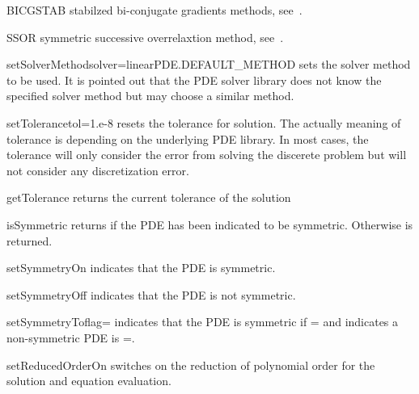 \begin{memberdesc}[LinearPDE]{BICGSTAB}
stabilzed bi-conjugate gradients methods, see~. 
\end{memberdesc}

\begin{memberdesc}[LinearPDE]{SSOR}
symmetric successive overrelaxtion method, see~.
\end{memberdesc}

\begin{methoddesc}[LinearPDE]{setSolverMethod}{solver=linearPDE.DEFAULT_METHOD}
sets the solver method to be used. It is pointed out that the PDE solver library
does not know the specified solver method but may choose a similar method. 
\end{methoddesc}

\begin{methoddesc}[LinearPDE]{setTolerance}{tol=1.e-8}
resets the tolerance for solution. The actually meaning of tolerance is
depending on the underlying PDE library. In most cases, the tolerance 
will only consider the error from solving the discerete problem but will
not consider any discretization error.
\end{methoddesc}

\begin{methoddesc}[LinearPDE]{getTolerance}{}
returns the current tolerance of the solution
\end{methoddesc}

\begin{methoddesc}[LinearPDE]{isSymmetric}{}
returns \True if the PDE has been indicated to be symmetric.
Otherwise \False is returned.
\end{methoddesc}

\begin{methoddesc}[LinearPDE]{setSymmetryOn}{}
indicates that the PDE is symmetric.
\end{methoddesc}

\begin{methoddesc}[LinearPDE]{setSymmetryOff}{}
indicates that the PDE is not symmetric.
\end{methoddesc}

\begin{methoddesc}[LinearPDE]{setSymmetryTo}{flag=\False}
indicates that the PDE is symmetric if =\True
and indicates a non-symmetric PDE is =\False. 
\end{methoddesc}

\begin{methoddesc}[LinearPDE]{setReducedOrderOn}{}
switches on the reduction of polynomial order for the solution and 
equation evaluation.
\end{methoddesc}


